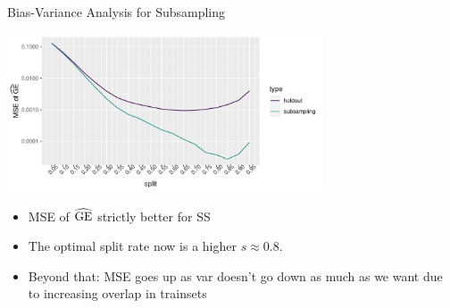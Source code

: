 \begin{vbframe}{Bias-Variance Analysis for Subsampling}

\begin{center}
\includegraphics[width=0.7\textwidth]{figure/eval-resampling-example-2}
\end{center}

\begin{itemize}
  \item MSE of $\widehat{\mathrm{GE}}$ strictly better for SS
  \item The optimal split rate now is a higher $s \approx 0.8$.
  \item Beyond that: MSE goes up as var doesn't go down as much as we want 
      due to increasing overlap in trainsets
\end{itemize}

\end{vbframe}




